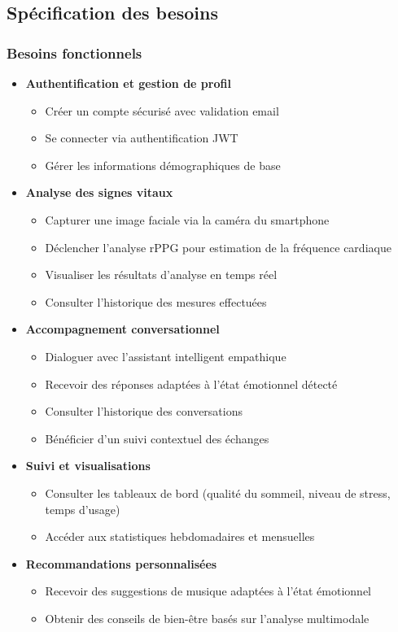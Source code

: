\subsection{Spécification des besoins}

\subsubsection{Besoins fonctionnels }
\begin{itemize}
    \item \textbf{Authentification et gestion de profil}
    \begin{itemize}
        \item Créer un compte sécurisé avec validation email
        \item Se connecter via authentification JWT
        \item Gérer les informations démographiques de base
    \end{itemize}
    
    \item \textbf{Analyse des signes vitaux}
    \begin{itemize}
        \item Capturer une image faciale via la caméra du smartphone
        \item Déclencher l'analyse rPPG pour estimation de la fréquence cardiaque
        \item Visualiser les résultats d'analyse en temps réel
        \item Consulter l'historique des mesures effectuées
    \end{itemize}
    
    \item \textbf{Accompagnement conversationnel}
    \begin{itemize}
        \item Dialoguer avec l'assistant intelligent empathique
        \item Recevoir des réponses adaptées à l'état émotionnel détecté
        \item Consulter l'historique des conversations
        \item Bénéficier d'un suivi contextuel des échanges
    \end{itemize}
    
    \item \textbf{Suivi et visualisations}
    \begin{itemize}
        \item Consulter les tableaux de bord (qualité du sommeil, niveau de stress, temps d'usage)
        \item Accéder aux statistiques hebdomadaires et mensuelles
    \end{itemize}
    
    \item \textbf{Recommandations personnalisées}
    \begin{itemize}
        \item Recevoir des suggestions de musique adaptées à l'état émotionnel
        \item Obtenir des conseils de bien-être basés sur l'analyse multimodale
   \end{itemize}
\end{itemize}
